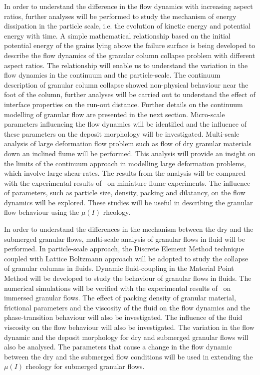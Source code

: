 In order to understand the difference in the flow 
dynamics with increasing 
aspect ratios, further analyses will be performed 
to study the mechanism of 
energy dissipation in the particle scale, i.e. 
the evolution of kinetic energy 
and potential energy with time. A simple 
mathematical relationship based on the 
initial potential energy of the grains lying 
above the failure surface is being 
developed to describe the flow dynamics of the 
granular column collapse problem 
with different aspect ratios. The relationship 
will enable us to understand the 
variation in the flow dynamics in the continuum 
and the particle-scale. The 
continuum description of granular column collapse 
showed non-physical behaviour 
near the foot of the column, further analyses 
will be carried out to understand 
the effect of interface properties on the run-out 
distance. Further details on 
the continuum modelling of granular flow are 
presented in the next section. 
Micro-scale parameters influencing the flow 
dynamics will be identified and the 
influence of these parameters on the deposit 
morphology will be investigated. 
Multi-scale analysis of large deformation flow 
problem such as flow of dry 
granular materials down an inclined flume will be 
performed. This analysis will 
provide an insight on the limits of the continuum 
approach in modelling large 
deformation problems, which involve large 
shear-rates. The results from the 
analysis will be compared with the experimental 
results 
of~\citet{Denlinger2001} on miniature flume 
experiments. The influence of 
parameters, such as particle size, density, 
packing and dilatancy, on the flow 
dynamics will be explored. These studies will be 
useful in describing the 
granular flow behaviour using the $\mu(I)$ 
rheology.

In order to understand the differences in the 
mechanism between the dry and the 
submerged granular flows, multi-scale analysis of 
granular flows in fluid will 
be performed. In particle-scale approach, the 
Discrete Element Method technique 
coupled with Lattice Boltzmann approach will be 
adopted to study the collapse 
of granular columns in fluids. Dynamic 
fluid-coupling in the Material Point 
Method will be developed to study the behaviour 
of granular flows in fluids. 
The numerical simulations will be verified with 
the experimental results 
of~\cite{Cassar2005} on immersed granular flows. 
The effect of packing density 
of granular material, frictional parameters and 
the viscosity of the fluid on 
the flow dynamics and the phase-transition 
behaviour will also be investigated. 
The influence of the fluid viscosity on the flow 
behaviour will also be 
investigated. The variation in the flow dynamic 
and the deposit morphology for 
dry and submerged granular flows will also be 
analysed. The parameters that 
cause a change in the flow dynamic between the 
dry and the submerged flow 
conditions will be used in extending the $\mu(I)$ 
rheology for submerged 
granular flows. 


